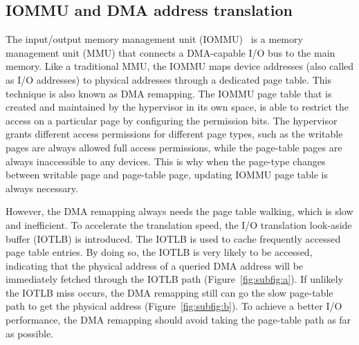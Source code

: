 \subsection{IOMMU and DMA address translation}
The input/output memory management unit (IOMMU)~\cite{directio} is a memory management unit (MMU) that connects a DMA-capable I/O bus to the main memory.
Like a traditional MMU, the IOMMU maps device addresses (also called as I/O addresses) to physical addresses through a dedicated page table.
This technique is also known as DMA remapping.
The IOMMU page table that is created and maintained by the hypervisor in its own space, is able to restrict the access on a particular page by configuring the permission bits.
The hypervisor grants different access permissions for different page types, such as the writable pages are always allowed full access permissions, while the page-table pages are always inaccessible to any devices.
This is why when the page-type changes between writable page and page-table page, updating IOMMU page table is always necessary.

However, the DMA remapping always needs the page table walking, which is slow and inefficient.
To accelerate the translation speed, the I/O translation look-aside buffer (IOTLB) is introduced.
The IOTLB is used to cache frequently accessed page table entries.
By doing so, the IOTLB is very likely to be accessed, indicating that the physical address of a queried DMA address will be immediately fetched through the IOTLB path (Figure~\ref{fig:subfig:a}).
If unlikely the IOTLB miss occurs, the DMA remapping still can go the slow page-table path to get the physical address (Figure~\ref{fig:subfig:b}).
To achieve a better I/O performance, the DMA remapping should avoid taking the page-table path as far as possible.

